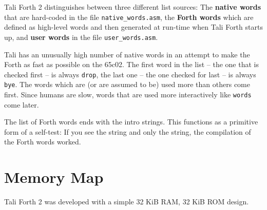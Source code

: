 Tali Forth 2 distinguishes between three different list sources: The
\textbf{native words} that are hard-coded in the file
\texttt{native\_words.asm}, the \textbf{Forth words} which
are defined as high-level words and then generated at run-time when Tali Forth
starts up, and \textbf{user words} in the file
\texttt{user\_words.asm}. 

Tali has an unusually high number of native words in an attempt to make the
Forth as fast as possible on the 65c02. The first word in the list
-- the one that is checked first -- is always
\texttt{drop}, the last one -- the one checked for
last -- is always \texttt{bye}. The words which are (or
are assumed to be) used more than others come first. Since humans are slow,
words that are used more interactively like
\texttt{words} come later. 

The list of Forth words ends with the intro strings. This
functions as a primitive form of a self-test: If you see the
string and only the string, the compilation of the Forth words worked.

\pagebreak

\section{Memory Map}


Tali Forth 2 was developed with a simple 32 KiB RAM, 32 KiB
ROM design. 

